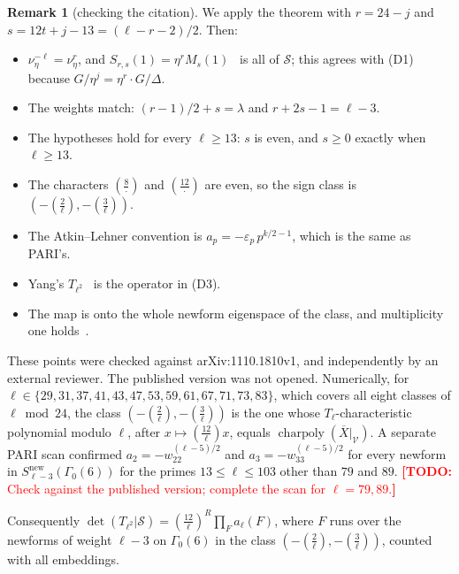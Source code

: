 \documentclass[11pt]{amsart}
\newcommand{\Xb}{\overline{X}}
\newcommand{\cS}{\mathcal{S}}
\newcommand{\cV}{\mathcal{V}}
\newcommand{\leg}[2]{\left(\frac{#1}{#2}\right)}
\DeclareMathOperator{\charpoly}{charpoly}
\newcommand{\TODO}[1]{\textcolor{red}{\textbf{[TODO:} #1\textbf{]}}}
\theoremstyle{plain}
\theoremstyle{definition}
\newtheorem{remark}[theorem]{Remark}
\numberwithin{equation}{section}
\begin{document}
\begin{remark}[checking the citation]\label{rem:yangcheck}
We apply the theorem with $r=24-j$ and $s=12t+j-13=(\ell-r-2)/2$. Then:
\begin{itemize}
\item $\nu_\eta^{-\ell}=\nu_\eta^r$, and $S_{r,s}(1)=\eta^rM_s(1)$~\cite[Prop.~6]{Yang2014} is all of $\cS$; this agrees
  with (D1) because $G/\eta^j=\eta^r\cdot G/\Delta$.
\item The weights match: $(r-1)/2+s=\lambda$ and $r+2s-1=\ell-3$.
\item The hypotheses hold for every $\ell\ge13$: $s$ is even, and $s\ge0$ exactly when $\ell\ge13$.
\item The characters $\leg{8}{\cdot}$ and $\leg{12}{\cdot}$ are even, so the sign class is $(-\leg{2}{\ell},-\leg{3}{\ell})$.
\item The Atkin--Lehner convention is $a_p=-\varepsilon_p\,p^{k/2-1}$, which is the same as PARI's.
\item Yang's $T_{\ell^2}$~\cite[Prop.~11]{Yang2014} is the operator in (D3).
\item The map is onto the whole newform eigenspace of the class, and multiplicity one holds~\cite[Cor.~1]{Yang2014}.
\end{itemize}
These points were checked against arXiv:1110.1810v1, and independently by an external reviewer. The published version
was not opened. Numerically, for $\ell\in\{29,31,37,41,43,47,53,59,61,67,71,73,83\}$, which covers all eight classes of
$\ell\bmod24$, the class $(-\leg2\ell,-\leg3\ell)$ is the one whose $T_\ell$-characteristic polynomial modulo $\ell$, after
$x\mapsto\leg{12}{\ell}x$, equals $\charpoly(\Xb|_\cV)$. A separate PARI scan confirmed $a_2=-w_22^{(\ell-5)/2}$ and
$a_3=-w_33^{(\ell-5)/2}$ for every newform in $S^{\mathrm{new}}_{\ell-3}(\Gamma_0(6))$ for the primes $13\le\ell\le103$
other than $79$ and $89$. \TODO{Check against the published version; complete the scan for $\ell=79,89$.}
\end{remark}

Consequently $\det(T_{\ell^2}|\cS)=\leg{12}{\ell}^R\prod_Fa_\ell(F)$, where $F$ runs over the newforms of weight $\ell-3$ on
$\Gamma_0(6)$ in the class $(-\leg2\ell,-\leg3\ell)$, counted with all embeddings.
\end{document}
